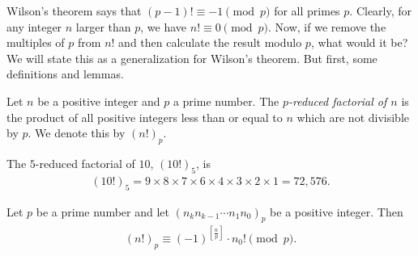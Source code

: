 \documentclass{subfile}
\begin{document}
Wilson's theorem says that $(p-1)! \equiv -1 \pmod p$ for all primes $p$. Clearly, for any integer $n$ larger than $p$, we have $n! \equiv 0 \pmod p$. Now, if we remove the multiples of $p$ from $n!$ and then calculate the result modulo $p$, what would it be? We will state this as a generalization for Wilson's theorem. But first, some definitions and lemmas.

	\begin{definition}
		Let $n$ be a positive integer and $p$ a prime number. The \textit{$p$-reduced factorial of $n$} is the product of all positive integers less than or equal to $n$ which are not divisible by $p$. We denote this by $(n!)_p$.
	\end{definition}

	\begin{example}
		The $5$-reduced factorial of $10$, $(10!)_5$, is
			\begin{align*}
				(10!)_5 = 9 \times 8 \times 7 \times 6 \times 4 \times 3 \times 2 \times 1 = 72,576.
			\end{align*}
	\end{example}


	\begin{theorem}\label{thm:reducedfactorialmodp}
		Let $p$ be a prime number and let $(n_k n_{k-1}\cdots n_1 n_0)_p$ be a positive integer. Then
			\begin{align*}
				(n!)_p\equiv (-1)^{\left[\frac{n}{p}\right]} \cdot n_0!\pmod p.
			\end{align*}
	\end{theorem}
\end{document}
